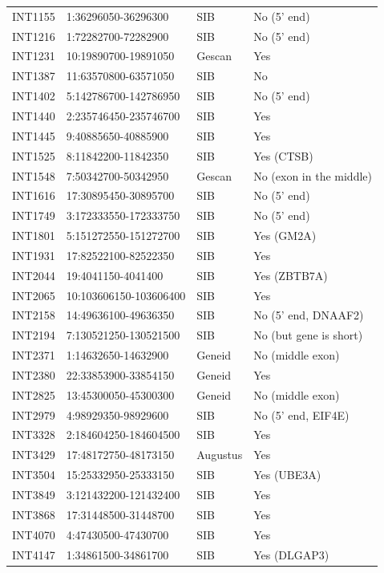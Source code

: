 \begin{table}[htbp]
\begin{tabular}{llll}
	INT1155 & 1:36296050-36296300 & SIB & No (5' end) \\
	INT1216 & 1:72282700-72282900 & SIB & No (5' end) \\
	INT1231 & 10:19890700-19891050 & Gescan & Yes \\
	INT1387 & 11:63570800-63571050 & SIB & No \\
	INT1402 & 5:142786700-142786950 & SIB & No (5' end) \\
	INT1440 & 2:235746450-235746700 & SIB & Yes \\
	INT1445 & 9:40885650-40885900 & SIB & Yes \\
	INT1525 & 8:11842200-11842350 & SIB & Yes (CTSB) \\
	INT1548 & 7:50342700-50342950 & Gescan & No (exon in the middle) \\
	INT1616 & 17:30895450-30895700 & SIB & No (5' end) \\
	INT1749 & 3:172333550-172333750 & SIB & No (5' end) \\
	INT1801 & 5:151272550-151272700 & SIB & Yes (GM2A) \\
	INT1931 & 17:82522100-82522350 & SIB & Yes \\
	INT2044 & 19:4041150-4041400 & SIB & Yes (ZBTB7A) \\
	INT2065 & 10:103606150-103606400 & SIB & Yes \\
	INT2158 & 14:49636100-49636350 & SIB & No (5' end, DNAAF2) \\
	INT2194 & 7:130521250-130521500 & SIB & No (but gene is short) \\
	INT2371 & 1:14632650-14632900 & Geneid & No (middle exon) \\
	INT2380 & 22:33853900-33854150 & Geneid & Yes \\
	INT2825 & 13:45300050-45300300 & Geneid & No (middle exon) \\
	INT2979 & 4:98929350-98929600 & SIB & No (5' end, EIF4E) \\
	INT3328 & 2:184604250-184604500 & SIB & Yes \\
	INT3429 & 17:48172750-48173150 & Augustus & Yes \\
	INT3504 & 15:25332950-25333150 & SIB & Yes (UBE3A) \\
	INT3849 & 3:121432200-121432400 & SIB & Yes \\
	INT3868 & 17:31448500-31448700 & SIB & Yes \\
	INT4070 & 4:47430500-47430700 & SIB & Yes \\
	INT4147 & 1:34861500-34861700 & SIB & Yes (DLGAP3)\\

\end{tabular}
\end{table}
